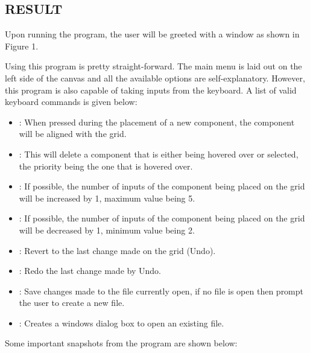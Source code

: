 \documentclass[report.tex]{subfiles}
\begin{document}
\begin{large}
\chapter{RESULT}
	Upon running the program, the user will be greeted with a window as shown in Figure 1. 

Using this program is pretty straight-forward. The main menu is laid out on the left side of the canvas and all the available options are self-explanatory. However, this program is also capable of taking inputs from the keyboard. A list of valid keyboard commands is given below:
    \begin{itemize}
        \item{ : When pressed during the placement of a new component, the component will be aligned with the grid.}
        \item{: This will delete a component that is either being hovered over or selected, the priority being the one that is hovered over.}
        \item{ : If possible, the number of inputs of the component being placed on the grid will be increased by 1, maximum value being 5.}
        \item{ : If possible, the number of inputs of the component being placed on the grid will be decreased by 1, minimum value being 2.}
        \item{: Revert to the last change made on the grid (Undo).}
        \item{: Redo the last change made by Undo.}
        \item{: Save changes made to the file currently open, if no file is open then prompt the user to create a new file.}
        \item{: Creates a windows dialog box to open an existing file.}
    \end{itemize}

Some important snapshots from the program are shown below:

\end{large}
\end{document}
